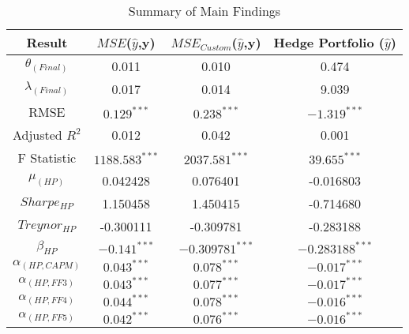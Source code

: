 \begin{table}[H]
    \centering
    \begin{tabular}{||c||c||c||c||}
        \hline
        Result & $MSE$($\hat{y}$,y) & $MSE_{Custom}$($\hat{y}$,y) & Hedge Portfolio ($\hat{y}$)\\ [0.5ex]
        \hline \hline
        $\theta_{(Final)}$ &0.011 & 0.010 & 0.474\\
        \hline
        $\lambda_{(Final)}$ & 0.017 & 0.014& 9.039 \\
        \hline \hline 
        RMSE & $0.129^{***}$ & $0.238^{***}$ & $-1.319^{***}$\\
        \hline
        Adjusted $R^{2}$ &0.012& 0.042 & 0.001\\
        \hline
        F Statistic & $1188.583^{***}$ & $2037.581^{***}$ & $39.655^{***}$\\
        \hline \hline
        $\mu_{(HP)}$ &0.042428 & 0.076401 & -0.016803\\
        \hline
        $Sharpe_{HP}$& 1.150458& 1.450415&  -0.714680\\ 
        \hline
        $Treynor_{HP}$ & -0.300111 & -0.309781& -0.283188\\ 
        \hline
        $\beta_{HP}$ & $-0.141^{***}$ & $-0.309781^{***}$& $-0.283188^{***}$\\ 
        \hline\hline
        $\alpha_{(HP,CAPM)}$ & $0.043^{***}$ & $0.078^{***}$& $-0.017^{***}$ \\
        \hline
        $\alpha_{(HP,FF3)}$ & $0.043^{***}$ & $0.077^{***}$& $-0.017^{***}$ \\
        \hline
        $\alpha_{(HP,FF4)}$ & $0.044^{***}$& $0.078^{***}$& $-0.016^{***}$\\
        \hline
        $\alpha_{(HP,FF5)}$& $0.042^{***}$ & $0.076^{***}$& $-0.016^{***}$\\
        \hline
    \end{tabular}
    \caption{Summary of Main Findings}
    \label{main-findings}
\end{table}
